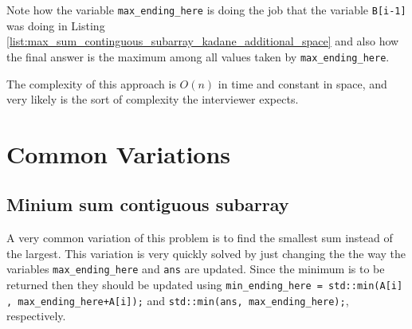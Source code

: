 Note how the variable \texttt{max_ending_here} is doing the job that the variable \texttt{B[i-1]} was doing in Listing \ref{list:max_sum_continguous_subarray_kadane_additional_space} and also how the final answer is the maximum among all values taken by \texttt{max_ending_here}.

The complexity of this approach is $O(n)$ in time and constant in space, and very likely is the sort of complexity the interviewer expects. 

\section{Common Variations}
\subsection{Minium sum contiguous subarray}
A very common variation of this problem is to find the smallest sum instead of the largest. This variation is very quickly solved by just changing the the way the variables \texttt{max_ending_here} and \texttt{ans} are updated. Since the minimum is to be returned then they should be updated using \lstinline[columns=fixed]{min_ending_here = std::min(A[i] , max_ending_here+A[i]);}  and \lstinline[columns=fixed]{std::min(ans, max_ending_here);}, respectively. 
